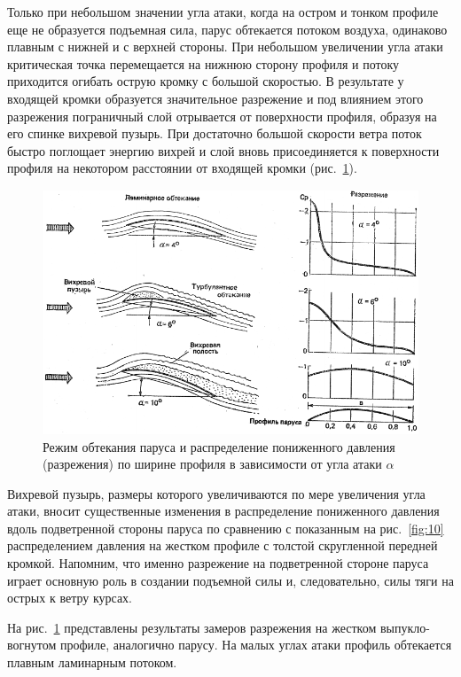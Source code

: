 \documentclass[a4paper, 12pt, twoside, final, book, russian, fittopage, cyremdash]{ncc}
\newcommand{\ris}[1]{\ref{fig:#1}}
\begin{document}
Только при небольшом значении угла атаки, когда на остром и тонком профиле еще не образуется подъемная сила, парус обтекается потоком воздуха, одинаково плавным с нижней и с верхней стороны. При небольшом увеличении угла атаки критическая точка перемещается на нижнюю сторону профиля и потоку приходится огибать острую кромку с большой скоростью. В результате у входящей кромки образуется значительное разрежение и под влиянием этого разрежения пограничный слой отрывается от поверхности профиля, образуя на его спинке вихревой пузырь. При достаточно большой скорости ветра поток быстро поглощает энергию вихрей и слой вновь  присоединяется к поверхности профиля на некотором расстоянии от входящей кромки (рис.~\ris{21}).

\begin{figure}[htb]
  \centering
  \includegraphics[scale=1.3]{0021P}
  \caption{Режим обтекания паруса и распределение пониженного давления (разрежения) по ширине профиля в зависимости от угла атаки $\alpha$}
  \label{fig:21}
\end{figure}

Вихревой пузырь, размеры которого увеличиваются по мере увеличения угла атаки, вносит существенные изменения в распределение пониженного давления вдоль подветренной стороны паруса по сравнению с показанным на рис.~\ris{10} распределением давления на жестком профиле с толстой скругленной передней кромкой. Напомним, что именно разрежение на подветренной стороне паруса играет основную роль в создании подъемной силы и, следовательно, силы тяги на острых к ветру курсах. 

На рис.~\ris{21} представлены результаты замеров разрежения на жестком выпукло-вогнутом профиле, аналогично парусу. На малых углах атаки профиль обтекается плавным ламинарным потоком. 
\end{document}
